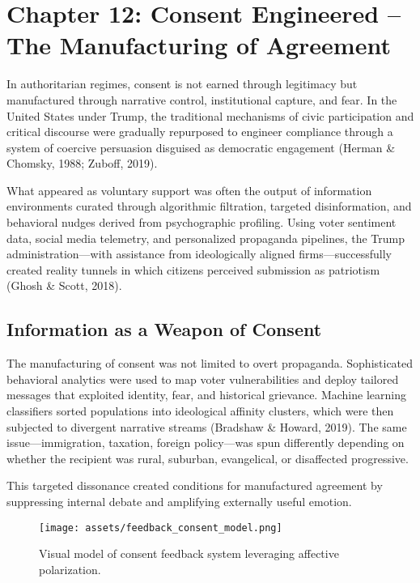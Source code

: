 \chapter{Chapter 12: Consent Engineered -- The Manufacturing of Agreement}

In authoritarian regimes, consent is not earned through legitimacy but
manufactured through narrative control, institutional capture, and fear.
In the United States under Trump, the traditional mechanisms of civic
participation and critical discourse were gradually repurposed to
engineer compliance through a system of coercive persuasion disguised as
democratic engagement (Herman \& Chomsky, 1988; Zuboff, 2019).

What appeared as voluntary support was often the output of information
environments curated through algorithmic filtration, targeted
disinformation, and behavioral nudges derived from psychographic
profiling. Using voter sentiment data, social media telemetry, and
personalized propaganda pipelines, the Trump administration---with
assistance from ideologically aligned firms---successfully created
reality tunnels in which citizens perceived submission as patriotism
(Ghosh \& Scott, 2018).

\section*{Information as a Weapon of Consent}

The manufacturing of consent was not limited to overt propaganda.
Sophisticated behavioral analytics were used to map voter
vulnerabilities and deploy tailored messages that exploited identity,
fear, and historical grievance. Machine learning classifiers sorted
populations into ideological affinity clusters, which were then
subjected to divergent narrative streams (Bradshaw \& Howard, 2019). The
same issue---immigration, taxation, foreign policy---was spun
differently depending on whether the recipient was rural, suburban,
evangelical, or disaffected progressive.

This targeted dissonance created conditions for manufactured agreement
by suppressing internal debate and amplifying externally useful emotion.

\begin{figure}[H]
    \centering
    \texttt{[image: assets/feedback\_consent\_model.png]}
    \caption{Visual model of consent feedback system leveraging affective polarization.}
    \label{fig:consent_feedback}
\end{figure}

